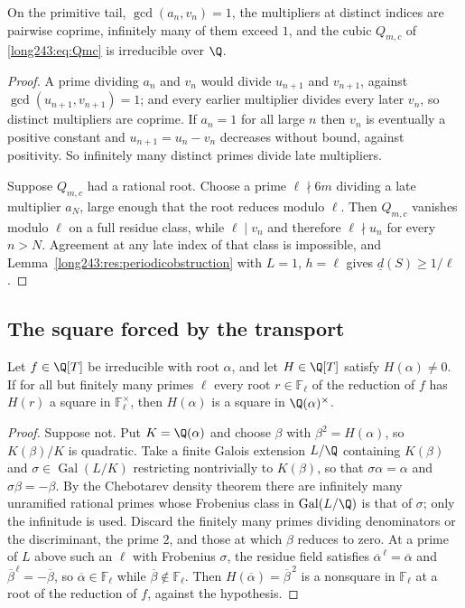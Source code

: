 \documentclass[11pt]{article}
\newcommand{\Fp}{\mathbb{F}}
\DeclareMathOperator{\Gal}{Gal}
\begin{document}
\begin{lemma}\label{long243:res:reduciblecase}
On the primitive tail, $\gcd(a_n,v_n)=1$, the multipliers at distinct indices
are pairwise coprime, infinitely many of them exceed $1$, and the cubic
$Q_{m,c}$ of \eqref{long243:eq:Qmc} is irreducible over $\Q$.
\end{lemma}

\begin{proof}
A prime dividing $a_n$ and $v_n$ would divide $u_{n+1}$ and $v_{n+1}$, against
$\gcd(u_{n+1},v_{n+1})=1$; and every earlier multiplier divides every later
$v_n$, so distinct multipliers are coprime.  If $a_n=1$ for all large $n$ then
$v_n$ is eventually a positive constant and $u_{n+1}=u_n-v_n$ decreases without
bound, against positivity.  So infinitely many distinct primes divide late
multipliers.

Suppose $Q_{m,c}$ had a rational root.  Choose a prime $\ell\nmid6m$ dividing a
late multiplier $a_N$, large enough that the root reduces modulo $\ell$.  Then
$Q_{m,c}$ vanishes modulo $\ell$ on a full residue class, while $\ell\mid v_n$
and therefore $\ell\nmid u_n$ for every $n>N$.  Agreement at any late index of
that class is impossible, and
Lemma~\ref{long243:res:periodicobstruction} with $L=1$, $h=\ell$ gives
$\underline d(S)\ge1/\ell$.
\end{proof}

\subsection{The square forced by the transport}

\begin{lemma}\label{long243:res:squarespec}
Let $f\in\Q[T]$ be irreducible with root $\alpha$, and let $H\in\Q[T]$ satisfy
$H(\alpha)\ne0$.  If for all but finitely many primes $\ell$ every root
$r\in\Fp_\ell$ of the reduction of $f$ has $H(r)$ a square in $\Fp_\ell^\times$,
then $H(\alpha)$ is a square in $\Q(\alpha)^\times$.
\end{lemma}

\begin{proof}
Suppose not.  Put $K=\Q(\alpha)$ and choose $\beta$ with $\beta^2=H(\alpha)$,
so $K(\beta)/K$ is quadratic.  Take a finite Galois extension $L/\Q$ containing
$K(\beta)$ and $\sigma\in\Gal(L/K)$ restricting nontrivially to $K(\beta)$, so
that $\sigma\alpha=\alpha$ and $\sigma\beta=-\beta$.  By the Chebotarev density
theorem there are infinitely many unramified rational primes whose Frobenius
class in $\Gal(L/\Q)$ is that of $\sigma$; only the infinitude is used.
Discard the finitely many primes dividing denominators or the discriminant,
the prime $2$, and those at which $\beta$ reduces to zero.  At a prime of $L$
above such an $\ell$ with Frobenius $\sigma$, the residue field satisfies
$\overline\alpha^{\,\ell}=\overline\alpha$ and
$\overline\beta^{\,\ell}=-\overline\beta$, so $\overline\alpha\in\Fp_\ell$ while
$\overline\beta\notin\Fp_\ell$.  Then $H(\overline\alpha)=\overline\beta^{\,2}$
is a nonsquare in $\Fp_\ell$ at a root of the reduction of $f$, against the
hypothesis.
\end{proof}
\end{document}
